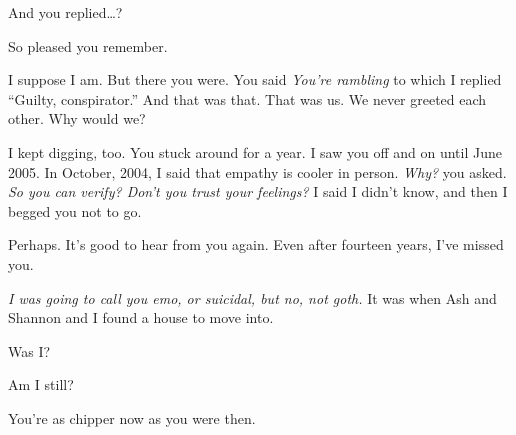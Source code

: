 And you replied\ldots{}?


So pleased you remember.


I suppose I am. But there you were. You said \emph{You're rambling} to which I replied ``Guilty, conspirator.'' And that was that. That was us. We never greeted each other. Why would we?

I kept digging, too. You stuck around for a year. I saw you off and on until June 2005. In October, 2004, I said that empathy is cooler in person. \emph{Why?} you asked. \emph{So you can verify? Don't you trust your feelings?} I said I didn't know, and then I begged you not to go.


Perhaps. It's good to hear from you again. Even after fourteen years, I've missed you.


\emph{I was going to call you emo, or suicidal, but no, not goth.} It was when Ash and Shannon and I found a house to move into.


Was I?


Am I still?


You're as chipper now as you were then.


\newpage

